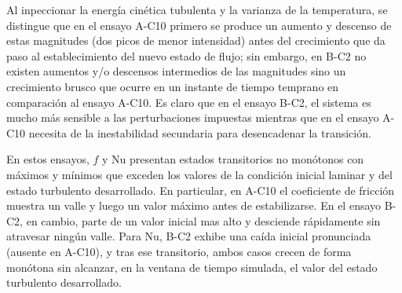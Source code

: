 Al inpeccionar la energía cinética tubulenta y la varianza de la temperatura, se distingue que en el ensayo A-C10 primero se produce un aumento y descenso de estas magnitudes (dos picos de menor intensidad) antes del crecimiento que da paso al establecimiento del nuevo estado de flujo; sin embargo, en B-C2 no existen aumentos y/o descensos intermedios de las magnitudes sino un crecimiento brusco que ocurre en un instante de tiempo temprano en comparación al ensayo A-C10. Es claro que en el ensayo B-C2, el sistema es mucho más sensible a las perturbaciones impuestas mientras que en el ensayo A-C10 necesita de la inestabilidad secundaria para desencadenar la transición. %





En estos ensayos, $f$ y Nu presentan estados transitorios no monótonos con máximos y mínimos que exceden los valores de la condición inicial laminar y del estado turbulento desarrollado. En particular, en A-C10 el coeficiente de fricción muestra un valle y luego un valor máximo antes de estabilizarse. En el ensayo B-C2, en cambio, parte de un valor inicial mas alto y desciende rápidamente sin atravesar ningún valle. Para $\text{Nu}$, B-C2 exhibe una caída inicial pronunciada (ausente en A-C10), y tras ese transitorio, ambos casos crecen de forma monótona sin alcanzar, en la ventana de tiempo simulada, el valor del estado turbulento desarrollado.

